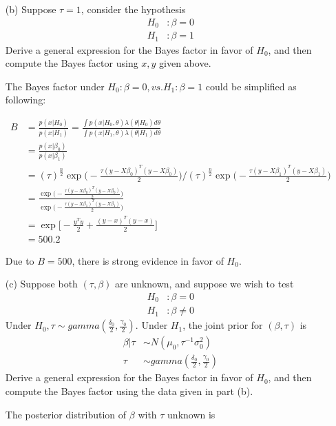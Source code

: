 \begin{itemize}
\begin{itemize}
\end{itemize}
\item[(b)] Suppose $\tau = 1$, consider the hypothesis 
\begin{align*}
H_0 &:  \beta = 0 \\
H_1 &: \beta = 1
\end{align*}
Derive a general expression for the Bayes factor in favor of $H_0$, and then compute the Bayes factor using $x, y$ given above.

The Bayes factor under $H_0:  \beta = 0, vs. H_1: \beta = 1$ could be simplified as following:

\begin{align*}
 B &=  \frac{p(x | {H_0})}{p(x| {H_1})} = \frac{\int p(x | H_0, \theta) \lambda(\theta| H_0) d\theta}{\int p(x | H_1, \theta) \lambda(\theta| H_1) d\theta}\\
 &= \frac{p(x | \beta_0)}{p(x | \beta_1)}  \\
 &= (\tau)^{\frac{n}{2}} \exp \Big(- \frac{\tau (y- X \beta_0)^T (y- X \beta_0)}{2} \Big) \Bigg / (\tau)^{\frac{n}{2}} \exp \Big(- \frac{\tau (y- X \beta_1)^T (y- X \beta_1)}{2} \Big) \\
 &= \frac{ \exp \Big(- \frac{\tau (y- X \beta_0)^T (y- X \beta_0)}{2} \Big) }{\exp \Big(- \frac{\tau (y- X \beta_1)^T (y- X \beta_1)}{2} \Big) }\\
 &= \exp \Big[-\frac{y^T y}{2} + \frac{(y-x)^T(y-x)}{2} \Big] \\
 &= 500.2
\end{align*}
 
 Due to $B = 500$, there is strong evidence in favor of $H_0$. 
 
 
  \item[(c)] Suppose both $(\tau, \beta)$ are unknown, and suppose we wish to test 
  \begin{align*}
 H_0 &:  \beta = 0 \\
 H_1 &: \beta \neq 0
\end{align*}
Under $H_0, \tau \sim gamma(\frac{\delta_0}{2}, \frac{\gamma_0}{2})$. Under $H_1$, the joint prior for $(\beta, \tau)$ is 
   \begin{align*}
 \beta | \tau & \sim N(\mu_0, \tau^{-1} \sigma_0^2)\\
 \tau &\sim gamma(\frac{\delta_0}{2}, \frac{\gamma_0}{2})
\end{align*}
Derive a general expression for the Bayes factor in favor of $H_0$, and then compute the Bayes factor using the data given in part (b).

 The posterior distribution of $\beta$ with $\tau$ unknown is
 

\end{itemize}

